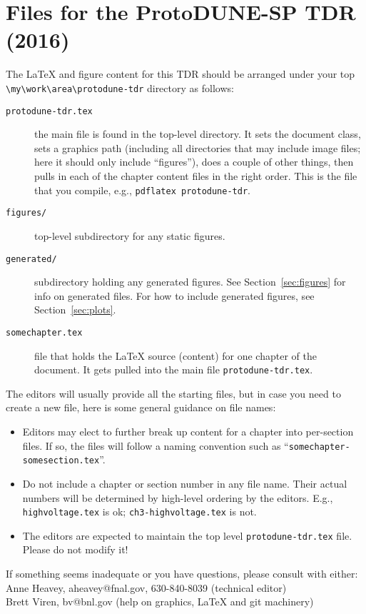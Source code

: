\section{Files for the ProtoDUNE-SP TDR (2016)}
\label{sec:files}


The \LaTeX{} and figure content for this TDR should be
arranged under your top\\ \verb|\my\work\area\protodune-tdr| directory as follows:

\begin{description}
\item[\texttt{protodune-tdr.tex}] the main file is found in the top-level
  directory. It sets the document class, sets a graphics path (including all directories that may include image files; here it should only include ``figures''), does a couple of other things, then pulls in each of the chapter content files in the right order.  This is the file that you compile, e.g., \verb|pdflatex protodune-tdr|.
\item[\texttt{figures/}] top-level subdirectory for any static figures.
\item[\texttt{generated/}] subdirectory holding any generated
  figures. See Section~\ref{sec:figures} for info on generated files. For how to include generated figures, see Section~\ref{sec:plots}.
\item[\texttt{somechapter.tex}] file that holds the \LaTeX{} source (content) for one
  chapter of the document. It gets pulled into the main file \texttt{protodune-tdr.tex}.
\end{description}

The editors will usually provide all the starting files, but in case you need to create a new file, here is some general guidance on file names:

\begin{itemize}
\item Editors may elect to further break up content for a chapter into per-section
  files.
  If so, the files will follow a naming convention such as
  ``\texttt{somechapter-somesection.tex}''.
\item Do not include a chapter or section number in any file
  name.
  Their actual numbers will be determined by high-level ordering by
  the editors.  E.g., \verb|highvoltage.tex| is ok; \verb|ch3-highvoltage.tex| is not.
\item The editors are expected to maintain the top level
  \texttt{protodune-tdr.tex} file.  Please do not modify it!
\end{itemize}
If something seems inadequate or you have questions, please consult with either: \\
  Anne Heavey, aheavey@fnal.gov, 630-840-8039 (technical editor)\\
  Brett Viren, bv@bnl.gov (help on graphics, \LaTeX{} and git machinery)





